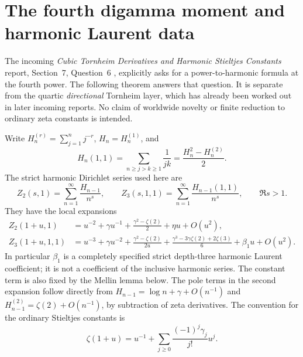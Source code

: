 \section{The fourth digamma moment and harmonic Laurent data}
\label{bhr:quartic-harmonic:sec}

The incoming \emph{Cubic Tornheim Derivatives and Harmonic Stieltjes Constants}
report, Section~7,
Question~6 \cite{bhr:Cubic}, explicitly asks for a power-to-harmonic formula at the fourth
power. The following theorem answers that question. It is separate from
the quartic \emph{directional} Tornheim layer, which has already been
worked out in later incoming reports. No claim of worldwide novelty or
finite reduction to ordinary zeta constants is intended.

Write $H_n^{(r)}=\sum_{j=1}^n j^{-r}$, $H_n=H_n^{(1)}$, and
\[
 H_n(1,1)=\sum_{n\ge j>k\ge1}\frac1{jk}
         =\frac{H_n^2-H_n^{(2)}}2.
\]
The strict harmonic Dirichlet series used here are
\[
 Z_2(s,1)=\sum_{n=1}^{\infty}\frac{H_{n-1}}{n^s},\qquad
 Z_3(s,1,1)=\sum_{n=1}^{\infty}\frac{H_{n-1}(1,1)}{n^s},
 \qquad \Re s>1.
\]
They have the local expansions
\begin{align}
 Z_2(1+u,1)&=u^{-2}+\gamma u^{-1}
       +\frac{\gamma^2-\zeta(2)}2+\eta u+O(u^2),
       \label{bhr:quartic-harmonic:eta}\\
 Z_3(1+u,1,1)&=u^{-3}+\gamma u^{-2}
       +\frac{\gamma^2-\zeta(2)}{2u}
       +\frac{\gamma^3-3\gamma\zeta(2)+2\zeta(3)}6
       +\beta_1u+O(u^2).
       \label{bhr:quartic-harmonic:beta}
\end{align}
In particular $\beta_1$ is a completely specified strict depth-three
harmonic Laurent coefficient; it is not a coefficient of the inclusive
harmonic series. The constant term is also fixed by the Mellin lemma below.
The pole terms in the second expansion follow directly
from $H_{n-1}=\log n+\gamma+O(n^{-1})$ and
$H_{n-1}^{(2)}=\zeta(2)+O(n^{-1})$, by subtraction of zeta derivatives.
The convention for the ordinary Stieltjes constants is
\[
 \zeta(1+u)=u^{-1}+\sum_{j\ge0}\frac{(-1)^j\gamma_j}{j!}u^j.
\]

